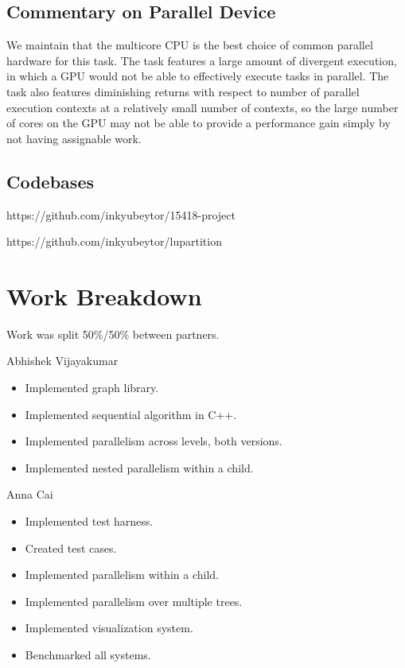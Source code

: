 \documentclass[11pt]{article}
\begin{document}
\subsection{Commentary on Parallel Device}

We maintain that the multicore CPU is the best choice of common parallel hardware for this task.
The task features a large amount of divergent execution, in which a GPU would not be able to effectively execute tasks in parallel.
The task also features diminishing returns with respect to number of parallel execution contexts at a relatively small number of contexts, so the large number of cores on the GPU may not be able to provide a performance gain simply by not having assignable work.




\subsection{Codebases}

https://github.com/inkyubeytor/15418-project

https://github.com/inkyubeytor/lupartition

\section*{Work Breakdown}

Work was split 50\%/50\% between partners.

Abhishek Vijayakumar
\begin{itemize}
    \item Implemented graph library.
    \item Implemented sequential algorithm in C++.
    \item Implemented parallelism across levels, both versions.
    \item Implemented nested parallelism within a child.
\end{itemize}

Anna Cai
\begin{itemize}
    \item Implemented test harness.
    \item Created test cases.
    \item Implemented parallelism within a child.
    \item Implemented parallelism over multiple trees.
    \item Implemented visualization system.
    \item Benchmarked all systems.
\end{itemize}
\end{document}
